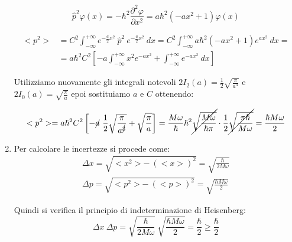 \documentclass[12pt,twoside,a4]{article}
\begin{document}
\begin{solution}
\begin{enumerate}[label=(\textit{\roman*})]
\begin{equation*}
	\hat{p}^2 \varphi(x) = -\hbar^2 \frac{\partial^2 \varphi}{\partial x^2} = a\hbar^2 \left( -a x^2 + 1 \right) \varphi(x)
\end{equation*}
	
\begin{align*}
	< p^2 >
	 &= C^2 \int_{-\infty}^{+\infty} e^{-\frac{a}{2}x^2} \ \hat{p}^2 \ e^{-\frac{a}{2}x^2} \ dx
	 = C^2 \int_{-\infty}^{+\infty} a\hbar^2 \left( -a x^2 + 1 \right) e^{ax^2} \ dx = \\
	 &= a\hbar^2C^2 \left[ -a \int_{-\infty}^{+\infty} x^2 e^{-ax^2} + \int_{-\infty}^{+\infty} e^{-ax^2} \ dx \right]
\end{align*}

Utilizziamo nuovamente gli integrali notevoli $2I_2(a)=\frac{1}{2} \sqrt{\frac{\pi}{a^3}}$ e $2I_0(a)=\sqrt{\frac{\pi}{a}}$ epoi sostituiamo $a$ e $C$ ottenendo:
	
\begin{equation*}
	< p^2 > 
	= a\hbar^2C^2  \left[ -\cancel{a} \ \frac{1}{2} \sqrt{\frac{\pi}{a^{\cancel{3}}}} + \sqrt{\frac{\pi}{a}} \right] 
	= \frac{M\omega}{\hbar} \hbar^2 \cancel{\sqrt{\frac{M\omega}{\hbar\pi}}} \cdot \frac{1}{2} \cancel{\sqrt{\frac{\pi\hbar}{M\omega}}}
	= \frac{\hbar M \omega}{2} 
\end{equation*}


\item Per calcolare le incertezze si procede come: 
\begin{gather*}
    \Delta x = \sqrt{< x^2 > - \ (< x >)^2} = \sqrt{\frac{\hbar}{2 M \omega}} \\
    \Delta p = \sqrt{< p^2 > - \ (< p >)^2 } = \sqrt{\frac{\hbar M \omega}{2}} 
\end{gather*}

Quindi si verifica il principio di indeterminazione di Heisenberg:
\begin{equation*}
    \Delta x \ \Delta p = \sqrt{\frac{\hbar}{2 M \omega}} \ \sqrt{\frac{\hbar M \omega}{2}} = \frac{\hbar}{2} \geq \frac{\hbar }{2} 
\end{equation*}

\end{enumerate}
\end{solution}
\end{document}
